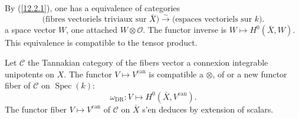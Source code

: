 \documentclass[12pt,a4paper]{article}
\theoremstyle{plain}
\theoremstyle{definition}
\theoremstyle{remark}
\DeclareMathOperator{\Spec}{Spec}
\newcommand{\DR}{\mathrm{DR}}
\newcommand{\can}{\mathrm{can}}
\begin{document}
By (\ref{12.2.1}), one has a equivalence of categories
$$\text{(fibres vectoriels triviaux sur } \bar{X}\text{)} \xrightarrow{\sim} \text{(espaces vectoriels sur } k\text{)}.$$
a space vector $W$, one attached $W \otimes \mathcal{O}$. The functor inverse is $W \mapsto H^0(\bar{X}, W)$. This equivalence is compatible to the tensor product.

Let $\mathcal{C}$ the Tannakian category of the fibers vector a connexion integrable unipotents on $X$. The functor $V \mapsto V^{\can}$ is compatible a $\otimes$, of or a new functor fiber of $\mathcal{C}$ on $\Spec(k)$:
\begin{equation}\label{12.4.1}
\omega_{\DR}: V \longmapsto H^0(\bar{X}, V^{\can}). \tag{12.4.1}
\end{equation}
The functor fiber $V \mapsto V^{\can}$ of $\mathcal{C}$ on $\bar{X}$ s'en deduces by extension of scalars.
\end{document}
